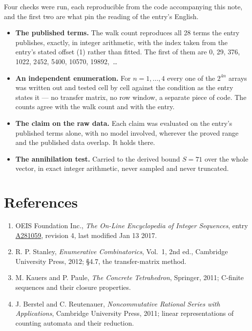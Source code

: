 \documentclass[11pt]{article}
\theoremstyle{definition}
\begin{document}
Four checks were run, each reproducible from the code accompanying this note, and the first two are what pin the reading of the entry's English.

\begin{itemize}

\item {\bfseries The published terms.} The walk count reproduces all 28 terms the entry publishes, exactly, in integer arithmetic, with the index taken from the entry's stated offset (1) rather than fitted. The first of them are 0, 29, 376, 1022, 2452, 5400, 10570, 19892,~\dots

\item {\bfseries An independent enumeration.} For $n = 1,\dots,4$ every one of the $2^{4n}$ arrays was written out and tested cell by cell against the condition as the entry states it --- no transfer matrix, no row window, a separate piece of code. The counts agree with the walk count and with the entry.

\item {\bfseries The claim on the raw data.} Each claim was evaluated on the entry's published terms alone, with no model involved, wherever the proved range and the published data overlap. It holds there.

\item {\bfseries The annihilation test.} Carried to the derived bound $S = 71$ over the whole vector, in exact integer arithmetic, never sampled and never truncated.

\end{itemize}

\section{References}

\begin{enumerate}

\item OEIS Foundation Inc., \emph{The On-Line Encyclopedia of Integer Sequences}, entry \href{https://oeis.org/A281059}{A281059}, revision 4, last modified Jan 13 2017.

\item R. P. Stanley, \emph{Enumerative Combinatorics}, Vol.~1, 2nd ed., Cambridge University Press, 2012; \S4.7, the transfer-matrix method.

\item M. Kauers and P. Paule, \emph{The Concrete Tetrahedron}, Springer, 2011; C-finite sequences and their closure properties.

\item J. Berstel and C. Reutenauer, \emph{Noncommutative Rational Series with Applications}, Cambridge University Press, 2011; linear representations of counting automata and their reduction.

\end{enumerate}
\end{document}

